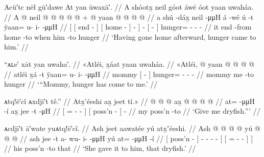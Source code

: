 \ex\label{ex:099-7-after-home-hunger-appear}%
%
\begingl
	\glpreamble	Acū′tc nēł gū′dawe At yan ūwaxā′. //
	\glpreamble	A shóotx̱ neil góot áwé óot yaan uwaháa. //
	\gla	{} {} A  @ {} {} {} neil @ {} {}
			 @ {} @ {} @ {} {}  @ {} +
		{}  @ {} {} yaan @  @ {} @ {} @ {} //
	\glb	{} {} a shú -dáx̱ {} {} neil {} {}
			{}  -μμH {} {} á -wé
		{} ú -t {} ÿaan= u- i-  -μμH //
	\glc	{}[ {}[  end - {}] {}[ home - {}]
			\·  - \· {}]  -
		{}[  - {}] hunger= - -  - //
	\gld	{} {} it end -from {} {} home -to {}
			 {} {} \·when {}  {}
		{} him -to {} hunger  {} {} {} //
	\glft	‘Having gone home afterward, hunger came to him.’
		//
\endgl
\xe

\ex\label{ex:099-8-mommy-hungry}%
%
\begingl
	\glpreamble	“ᴀʟe′ xāt yan uwaha′. //
	\glpreamble	«\!Atléi, x̱áat yaan uwaháa. //
	\gla	«\!Atléi, {}  @ {} {} yaan @  @ {} @ {} @ {} //
	\glb	\pqp{}atléi {} x̱á -t {} ÿaan= u- i-  -μμH //
	\glc	\pqp{}mommy {}[  - {}] hunger= - -  - //
	\gld	\pqp{}mommy {} me -to {} hunger  {} {} {}  //
	\glft	‘“Mommy, hunger has come to me.’
		//
\endgl
\xe

\ex\label{ex:099-9-gimme-dryfish}%
%
\begingl
	\glpreamble	ᴀtq!ē′cî ᴀxdjī′t tê.” //
	\glpreamble	Atx̱'éeshi ax̱ jeet tí.\!» //
	\gla	{}  @ {} @ {} @ {} {}
		{} ax̱  @ {} {}  @ {} @ {} @ {} //
	\glb	{} at=  -μμH -í {}
		{} ax̱ jee -t {} {} {}  -μH //
	\glc	{}[ =  - - {}]
		{}[  poss’n - {}] \· \·  - //
	\gld	{}  {} {} {} {}
		{} my poss’n -to {}  {} {} {} //
	\glft	‘Give me dryfish.”’
		//
\endgl
\xe

\ex\label{ex:099-10-gave-him-dryfish}%
%
\begingl
	\glpreamble	ᴀcdjī′t ā′wate yuᴀtq!ē′cî. //
	\glpreamble	Ash jeet aawatée yú atx̱ʼéeshi. //
	\gla	{} Ash  {} {}  @ {} @ {} @ {} @ {}
		{} yú {}  @ {} @ {} @ {} {} {} //
	\glb	{} ash jee -t {} a- wu- i-  -μμH
		{} yú {} at=  -μμH -í {} {} //
	\glc	{}[  poss’n - {}] - - -  -
		{}[  {}[ =  - - {}] {}] //
	\gld	{} his poss’n -to {}  {} {} {} {}
		{} that {}  {} {} {} {} {} //
	\glft	‘She gave it to him, that dryfish.’
		//
\endgl
\xe

